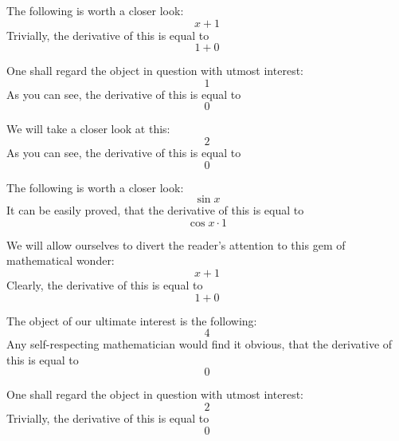\documentclass{article}
\begin{document}
The following is worth a closer look:
\begin{equation}
x + 1 
\end{equation}
Trivially, the derivative of this is equal to
\begin{equation}
1 + 0 
\end{equation}

One shall regard the object in question with utmost interest:
\begin{equation}
1 
\end{equation}
As you can see, the derivative of this is equal to
\begin{equation}
0 
\end{equation}

We will take a closer look at this:
\begin{equation}
2 
\end{equation}
As you can see, the derivative of this is equal to
\begin{equation}
0 
\end{equation}

The following is worth a closer look:
\begin{equation}
\sin x 
\end{equation}
It can be easily proved, that the derivative of this is equal to
\begin{equation}
\cos x \cdot 1 
\end{equation}

We will allow ourselves to divert the reader's attention to this gem of mathematical wonder:
\begin{equation}
x + 1 
\end{equation}
Clearly, the derivative of this is equal to
\begin{equation}
1 + 0 
\end{equation}

The object of our ultimate interest is the following:
\begin{equation}
4 
\end{equation}
Any self-respecting mathematician would find it obvious, that the derivative of this is equal to
\begin{equation}
0 
\end{equation}

One shall regard the object in question with utmost interest:
\begin{equation}
2 
\end{equation}
Trivially, the derivative of this is equal to
\begin{equation}
0 
\end{equation}
\end{document}

